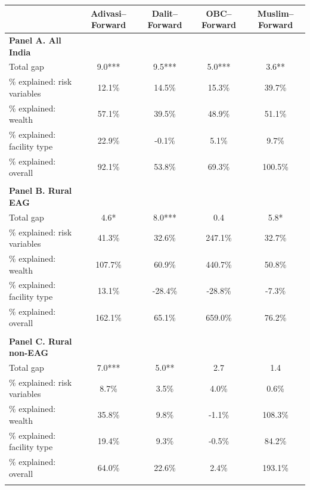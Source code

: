 \begin{tabular}{lcccc}
\hline
 & Adivasi--Forward & Dalit--Forward & OBC--Forward & Muslim--Forward \\
\hline
\textbf{Panel A. All India}&&&&\\
Total gap&9.0***&9.5***&5.0***&3.6**\\
\% explained: risk variables&12.1\%&14.5\%&15.3\%&39.7\%\\
\% explained: wealth&57.1\%&39.5\%&48.9\%&51.1\%\\
\% explained: facility type&22.9\%&-0.1\%&5.1\%&9.7\%\\
\% explained: overall&92.1\%&53.8\%&69.3\%&100.5\%\\
&&&&\\
\textbf{Panel B. Rural EAG}&&&&\\
Total gap&4.6*&8.0***&0.4&5.8*\\
\% explained: risk variables&41.3\%&32.6\%&247.1\%&32.7\%\\
\% explained: wealth&107.7\%&60.9\%&440.7\%&50.8\%\\
\% explained: facility type&13.1\%&-28.4\%&-28.8\%&-7.3\%\\
\% explained: overall&162.1\%&65.1\%&659.0\%&76.2\%\\
&&&&\\
\textbf{Panel C. Rural non-EAG}&&&&\\
Total gap&7.0***&5.0**&2.7&1.4\\
\% explained: risk variables&8.7\%&3.5\%&4.0\%&0.6\%\\
\% explained: wealth&35.8\%&9.8\%&-1.1\%&108.3\%\\
\% explained: facility type&19.4\%&9.3\%&-0.5\%&84.2\%\\
\% explained: overall&64.0\%&22.6\%&2.4\%&193.1\%\\
&&&&\\
\hline
\end{tabular}
